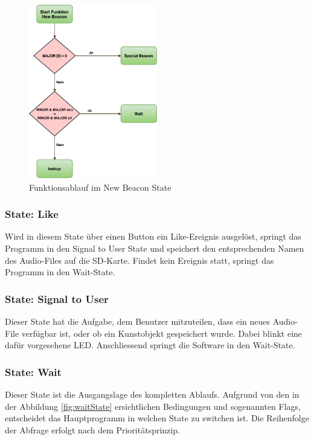 \begin{figure}[htbp!!!!]
	\centering
	\includegraphics[width=0.5\textwidth]{Data/NewBeacon_picture.pdf}
	\caption[Statemachine: New Beacon]{Funktionsablauf im New Beacon State}
	\label{fig:newBeaconState}
\end{figure} 

\subsubsection*{State: Like}

Wird in diesem State über einen Button ein Like-Ereignis ausgelöst, springt das Programm in den Signal to User State und speichert den entsprechenden Namen des Audio-Files auf die SD-Karte. Findet kein Ereignis statt, springt das Programm in den Wait-State.

\subsubsection*{State: Signal to User}

Dieser State hat die Aufgabe, dem Benutzer mitzuteilen, dass ein neues Audio-File verfügbar ist, oder ob ein Kunstobjekt gespeichert wurde. Dabei blinkt eine dafür vorgesehene LED. Anschliessend springt die Software in den Wait-State.

\subsubsection*{State: Wait}

Dieser State ist die Ausgangslage des kompletten Ablaufs. Aufgrund von den in der Abbildung \ref{fig:waitState} ersichtlichen Bedingungen und sogenannten Flags, entscheidet das Hauptprogramm in welchen State zu switchen ist. Die Reihenfolge der Abfrage erfolgt nach dem Prioritätsprinzip.

